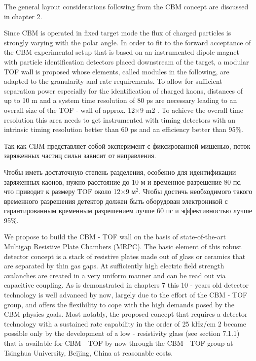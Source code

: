 The general layout considerations following from the CBM concept are discussed in chapter 2.

Since CBM is operated in fixed target mode the flux of charged particles is strongly varying with the polar angle. In order to fit to the forward acceptance of the CBM experimental setup that is based on an instrumented dipole magnet with particle identification detectors placed downstream of the target, a modular TOF wall is proposed whose elements, called modules in the following, are adapted to the granularity and rate requirements. To allow for sufficient separation power especially for the identification of charged kaons, distances of up to 10 m and a system time resolution of 80 ps are necessary leading to an overall size of the TOF - wall of approx. 12$\times$9 m2 . To achieve the overall time resolution this area needs to get instrumented with timing detectors with an intrinsic timing resolution better than 60 ps and an efficiency better than 95\%.

Так как CBM представляет собой эксперимент с фиксированной мишенью, поток заряженных частиц сильн зависит от направления.

Чтобы иметь достаточную степень разделения, особенно для идентификации заряженных каонов, нужно расстояние до 10 м и временное разрешение 80 пс, что приводит к размеру TOF около 12$\times$9 м$^2$. Чтобы достичь необходимого такого временного разрешения детектор должен быть оборудован электроникой с гарантированным временным разрешением лучше 60 пс и эффективностью лучше 95\%.

We propose to build the CBM - TOF wall on the basis of state-of-the-art Multigap Resistive Plate Chambers (MRPC). The basic element of this robust detector concept is a stack of resistive plates made out of glass or ceramics that are separated by thin gas gaps. At sufficiently high electric field strength avalanches are created in a very uniform manner and can be read out via capacitive coupling. As is demonstrated in chapters 7 this 10 - years old detector technology is well advanced by now, largely due to the effort of the CBM - TOF group, and offers the flexibility to cope with the high demands posed by the CBM physics goals. Most notably, the proposed concept that requires a detector technology with a sustained rate capability in the order of 25 kHz/cm 2 became possible only by the development of a low - resistivity glass (see section 7.1.1) that is available for CBM - TOF by now through the CBM - TOF group at Tsinghua University, Beijing, China at reasonable costs.

